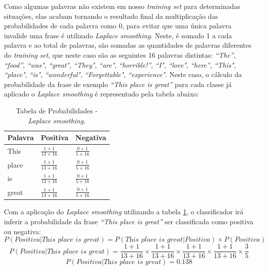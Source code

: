 Como algumas palavras não existem em nosso \textit{training set} para
determinadas situações, elas acabam tornando o resultado final da multiplicação
das probabilidades de cada palavra como 0, para evitar que uma única palavra
invalide uma frase é utilizado \textit{Laplace smoothing}. Neste, é somado
1 a cada palavra e ao total de palavras, são somadas as quantidades de palavras diferentes do \textit{training set}, que neste caso são
as seguintes 16 palavras distintas: \textit{``The''}, \textit{``food''},
\textit{``was"}, \textit{``great"}, \textit{``They"}, \textit{``are"},
\textit{``horrible!''}, \textit{``I"}, \textit{``love"}, \textit{``here''},
\textit{``This"}, \textit{``place"}, \textit{``is"}, \textit{``wonderful"},
\textit{``Forgettable"}, \textit{``experience"}. Neste caso, o cálculo da
probabilidade da frase de exemplo \textit{``This place is great''} para cada
classe já aplicado o \textit{Laplace smoothing} é representado pela tabela
abaixo:

\begin{table}[htb]
\centering
\renewcommand{\arraystretch}{1.5}%
\begin{tabular}{lll}
\hline

Palavra & Positiva & Negativa \\ \hline
This & \large $\frac{1 + 1}{13 + 16}$ & \large $\frac{0 + 1}{5 + 16}$ \\
place & \large $\frac{1 + 1}{13 + 16}$ & \large $\frac{0 + 1}{5 + 16}$ \\
is & \large $\frac{1 + 1}{13 + 16}$ & \large $\frac{0 + 1}{5 + 16}$ \\
great & \large $\frac{1 + 1}{13 + 16}$ & \large $\frac{0 + 1}{5 + 16}$ \\
\end{tabular}
\caption{Tabela de Probabilidades - \textit{Laplace smoothing}.}
\label{tab:probabilidadesnb}
\end{table}

Com a aplicação do \textit{Laplace smoothing} utilizando a tabela
\ref{tab:probabilidadesnb}, o classificador irá inferir a probabilidade da frase \textit{``This place is great''} ser classificada como
positiva ou negativa:
\[ P(Positiva|\textit{This place is great})
=
P(\textit{This place is great}|Positiva) \times
P(Positiva)
\]
\[ P(Positiva|\textit{This place is great}) = \frac{1 + 1}{13 + 16} \times
\frac{1 + 1}{13 + 16} \times \frac{1 + 1}{13 + 16} \times
\frac{1 + 1}{13 + 16} \times \frac{3}{5}
\]
\[ P(Positiva|\textit{This place is great})  = 0.138
\]

